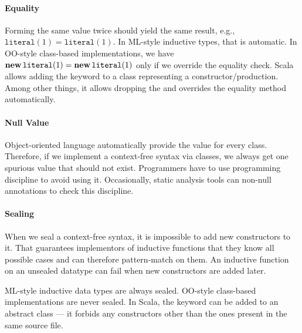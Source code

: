 \paragraph{Equality}
Forming the same value twice should yield the same result, e.g., $\mathtt{literal}(1)=\mathtt{literal}(1)$.
In ML-style inductive types, that is automatic.
In OO-style class-based implementations, we have $\textbf{new}\,\mathtt{literal}(1)=\textbf{new}\,\mathtt{literal}(1)$ only if we override the equality check.
Scala allows adding the keyword  to a class representing a constructor/production.
Among other things, it allows dropping the  and overrides the equality method automatically. 

\paragraph{Null Value}
Object-oriented language automatically provide the  value for every class.
Therefore, if we implement a context-free syntax via classes, we always get one spurious value that should not exist.
Programmers have to use programming discipline to avoid using it.
Occasionally, static analysis tools can non-null annotations to check this discipline.

\paragraph{Sealing}
When we seal a context-free syntax, it is impossible to add new constructors to it.
That guarantees implementors of inductive functions that they know all possible cases and can therefore pattern-match on them.
An inductive function on an unsealed datatype can fail when new constructors are added later.

ML-style inductive data types are always sealed.
OO-style class-based implementations are never sealed.
In Scala, the keyword  can be added to an abstract class --- it forbids any constructors other than the ones present in the same source file.




